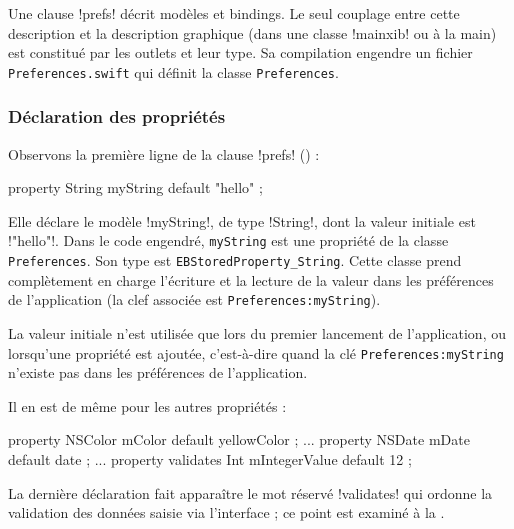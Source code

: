 Une clause \eb!prefs! décrit modèles et bindings. Le seul couplage entre cette description et la description graphique (dans une classe \eb!mainxib! ou à la main) est constitué par les outlets et leur type. Sa compilation engendre un fichier \texttt{Preferences.swift} qui définit la classe \texttt{Preferences}.

%

\subsubsection{Déclaration des propriétés}

Observons la première ligne de la clause \eb!prefs! () :
\begin{ebcode}
  property String myString default "hello" ;
\end{ebcode}

Elle déclare le modèle \eb!myString!, de type \eb!String!, dont la valeur initiale est \eb!"hello"!. Dans le code engendré, \texttt{myString} est une propriété de la classe \texttt{Preferences}. Son type est \texttt{EBStoredProperty\_String}. Cette classe prend complètement en charge l'écriture et la lecture de la valeur dans les préférences de l'application (la clef associée est \texttt{Preferences:myString}).

La valeur initiale n'est utilisée que lors du premier lancement de l'application, ou lorsqu'une propriété est ajoutée, c'est-à-dire quand la clé \texttt{Preferences:myString} n'existe pas dans les préférences de l'application.

Il en est de même pour les autres propriétés :
\begin{ebcode}
property NSColor mColor default yellowColor ;
  ...
property NSDate mDate default date ;
  ...
property validates Int mIntegerValue default 12 ;
\end{ebcode}

La dernière déclaration fait apparaître le mot réservé \eb!validates! qui ordonne la validation des données saisie via l'interface ; ce point est examiné à la .


